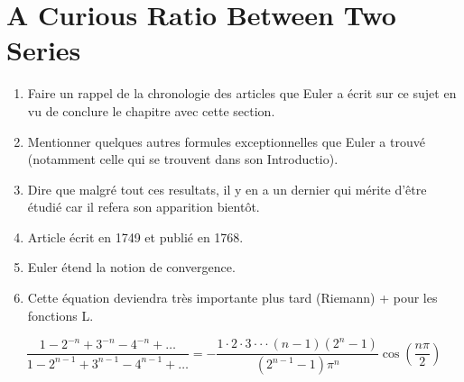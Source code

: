 \section{A Curious Ratio Between Two Series}

\td

\begin{enumerate}
    \item Faire un rappel de la chronologie des articles que Euler a écrit sur ce sujet en vu de conclure le chapitre avec cette section.
    \item Mentionner quelques autres formules exceptionnelles que Euler a trouvé (notamment celle qui se trouvent dans son Introductio).
    \item Dire que malgré tout ces resultats, il y en a un dernier qui mérite d'être étudié car il refera son apparition bientôt.
    \item Article écrit en 1749 et publié en 1768.
    \item Euler étend la notion de convergence.
    \item Cette équation deviendra très importante plus tard (Riemann) + pour les fonctions L.
\end{enumerate}

$$\frac{1 - 2^{-n} + 3^{-n} - 4^{-n} + \dots }{1 - 2^{n-1} + 3^{n-1} - 4^{n-1} + \dots } = - \frac{1\cdot 2 \cdot 3 \cdot \cdot \cdot (n-1)(2^n-1)}{(2^{n-1} - 1) \pi^n}\cos \left(\frac{n \pi}{2}\right)$$
\td 